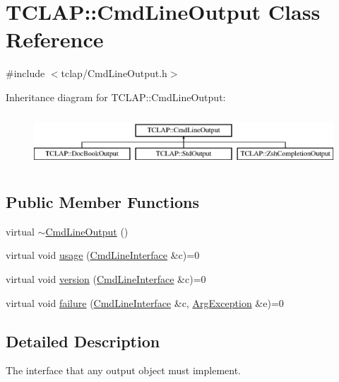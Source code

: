 \hypertarget{class_t_c_l_a_p_1_1_cmd_line_output}{}\section{T\+C\+L\+A\+P\+:\+:Cmd\+Line\+Output Class Reference}
\label{class_t_c_l_a_p_1_1_cmd_line_output}


{\ttfamily \#include $<$tclap/\+Cmd\+Line\+Output.\+h$>$}

Inheritance diagram for T\+C\+L\+A\+P\+:\+:Cmd\+Line\+Output\+:\begin{figure}[H]
\begin{center}
\leavevmode
\includegraphics[height=1.996435cm]{class_t_c_l_a_p_1_1_cmd_line_output}
\end{center}
\end{figure}
\subsection*{Public Member Functions}
\begin{DoxyCompactItemize}
\item 
virtual \hyperlink{class_t_c_l_a_p_1_1_cmd_line_output_afdf4435a2619076d9798a0a950ed405b}{$\sim$\+Cmd\+Line\+Output} ()
\item 
virtual void \hyperlink{class_t_c_l_a_p_1_1_cmd_line_output_a685b13db5bf6bbe5159e49169cd96bbe}{usage} (\hyperlink{class_t_c_l_a_p_1_1_cmd_line_interface}{Cmd\+Line\+Interface} \&c)=0
\item 
virtual void \hyperlink{class_t_c_l_a_p_1_1_cmd_line_output_ae052fea473132482296de55edb3dd480}{version} (\hyperlink{class_t_c_l_a_p_1_1_cmd_line_interface}{Cmd\+Line\+Interface} \&c)=0
\item 
virtual void \hyperlink{class_t_c_l_a_p_1_1_cmd_line_output_ad23a57ac3d8d957a4328fc78aec94e16}{failure} (\hyperlink{class_t_c_l_a_p_1_1_cmd_line_interface}{Cmd\+Line\+Interface} \&c, \hyperlink{class_t_c_l_a_p_1_1_arg_exception}{Arg\+Exception} \&e)=0
\end{DoxyCompactItemize}


\subsection{Detailed Description}
The interface that any output object must implement. 

